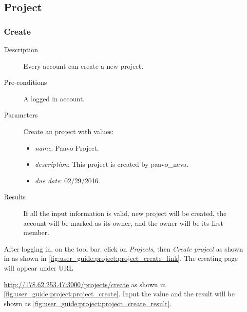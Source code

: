 \subsection{Project}
\label{ch:appendix-a:user_guide:project}
\subsubsection{Create}
\label{ch:appendix-a:user_guide:project:create}

\begin{description}
\item[Description] Every account can create a new project.
\item[Pre-conditions] A logged in account.
\item[Parameters] Create an project with values:
\begin{itemize}
\item \emph{name}: Paavo Project.
\item \emph{description}:  This project is created by paavo\_neva.
\item \emph{due date}: 02/29/2016.
\end{itemize}
\item[Results] If all the input information is valid, new project will be created, the account will be marked as its owner, and the owner will be its first member.
\end{description}

After logging in, on the tool bar, click on \emph{Projects}, then \emph{Create project} as shown in as shown in \autoref{fig:user_guide:project:project_create_link}.
The creating page will appear under URL 

\noindent\href{http://178.62.253.47:3000/projects/create}{http://178.62.253.47:3000/projects/create} as shown in \autoref{fig:user_guide:project:project_create}.
Input the value and the result will be shown as \autoref{fig:user_guide:project:project_create_result}.

